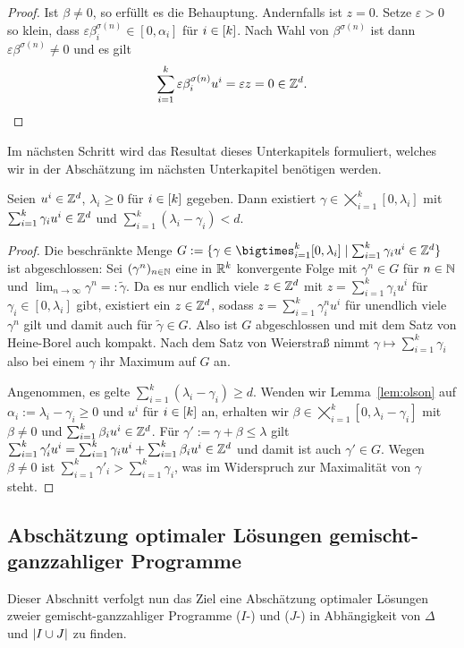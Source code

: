 \begin{proof}
	Ist $\beta\neq0$, so erfüllt es die Behauptung.
	Andernfalls ist $z=0$.
	Setze $\varepsilon>0$ so klein, dass $\varepsilon\beta^{\sigma(n)}_i\in[0,\alpha_i]$ für $i\in[k]$.
	Nach Wahl von $\beta^{\sigma(n)}$ ist dann $\varepsilon\beta^{\sigma(n)}\neq0$ und es gilt $$\sum_{i=1}^k\varepsilon\beta^{\sigma(n)}_iu^i=\varepsilon z=0\in\mathbb{Z}^d.$$
\end{proof}

Im nächsten Schritt wird das Resultat dieses Unterkapitels formuliert, welches wir in der Abschätzung im nächsten Unterkapitel benötigen werden.

\begin{lemma}\label{lem:maxgamma}
	Seien $u^i\in\mathbb{Z}^d$, $\lambda_i\geq0$ für $i\in[k]$ gegeben.
	Dann existiert $\gamma\in\bigtimes_{i=1}^k [0,\lambda_i]$ mit $\sum_{i=1}^k \gamma_i u^i\in\mathbb{Z}^d$ und  $\sum_{i=1}^k(\lambda_i-\gamma_i)<d$.
\end{lemma}
\begin{proof}
	Die beschränkte Menge $G:=\{\gamma \in \bigtimes_{i=1}^k [0,\lambda_i] \mid \sum_{i=1}^k \gamma_i u^i\in\Z^d \}$ ist abgeschlossen: Sei $(\gamma^n)_{n\in\mathbb{N}}$ eine in $\mathbb{R}^k$ konvergente Folge mit $\gamma^n\in G$ für $n\in\mathbb{N}$ und $\lim_{n\to\infty}\gamma^n=:\tilde{\gamma}$.
	Da es nur endlich viele $z\in\mathbb{Z}^d$ mit $z=\sum_{i=1}^k\gamma_iu^i$ für $\gamma_i\in[0,\lambda_i]$ gibt, existiert ein $z\in\mathbb{Z}^d$, sodass $z=\sum_{i=1}^k\gamma^n_iu^i$ für unendlich viele $\gamma^n$ gilt und damit auch für $\tilde{\gamma}\in G$.
	Also ist $G$ abgeschlossen und mit dem Satz von Heine-Borel auch kompakt.
	Nach dem Satz von Weierstraß nimmt $\gamma \mapsto \sum_{i=1}^k\gamma_i$ also bei einem $\gamma$ ihr Maximum auf $G$ an.
	
	Angenommen, es gelte $\sum_{i=1}^k(\lambda_i - \gamma_i) \geq d$.
	Wenden wir Lemma~\ref{lem:olson} auf $\alpha_i:=\lambda_i-\gamma_i\geq0$ und $u^i$ für $i\in[k]$ an, erhalten wir $\beta\in\bigtimes_{i=1}^k[0,\lambda_i-\gamma_i]$ mit $\beta\neq0$ und $\sum_{i=1}^k \beta_i u^i\in\mathbb{Z}^d$.
	Für $\gamma':=\gamma+\beta\leq\lambda$ gilt 
	$
	\sum_{i=1}^k\gamma'_iu^i = \sum_{i=1}^k\gamma_iu^i + \sum_{i=1}^k \beta_iu^i\in\mathbb{Z}^d
	$
	und damit ist auch $\gamma'\in G$.
	Wegen $\beta\neq0$ ist $\sum_{i=1}^k\gamma'_i > \sum_{i=1}^k\gamma_i$, was im Widerspruch zur Maximalität von $\gamma$ steht.
\end{proof}

\subsection{Abschätzung optimaler Lösungen gemischt-ganzzahliger Programme}
Dieser Abschnitt verfolgt nun das Ziel eine Abschätzung optimaler Lösungen zweier gemischt-ganzzahliger Programme	($I$-\MIPR) und ($J$-\MIPR) in Abhängigkeit von $\Delta$ und $\lvert I\cup J \rvert$ zu finden.


